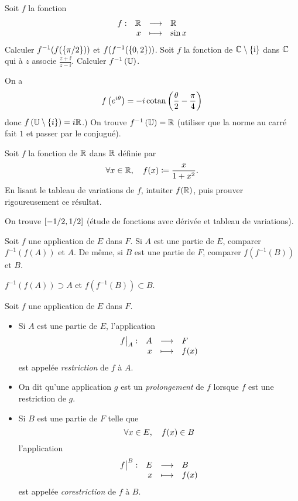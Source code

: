 \documentclass{magnolia}
\begin{document}
\begin{exos}
\exo Soit $f$ la fonction
  \[\begin{array}[t]{lrcl} \displaystyle{f} : & \displaystyle{\mathbb{R}} & \longrightarrow & \displaystyle{\mathbb{R}} \\ & \displaystyle{x} & \longmapsto & \displaystyle{\sin x} \end{array}\]
  Calculer $f^{-1}(f(\left\{\pi/2\right\}))$ et $f(f^{-1}(\left\{0, 2\right\}))$.
\exo Soit $f$ la fonction de $\mathbb{C}\setminus\left\{{\rm i}\right\}$ dans $\mathbb{C}$ qui à $z$
  associe $\frac{z+\ii}{z-\ii}$. Calculer %
  $f^\applirec \p{\U}$.
  \begin{sol}
  On a
  \[f\left(e^{i\theta}\right)=-i\operatorname{cotan}\left(\frac{\theta}{2}-\frac{\pi}{4}\right)\]
  donc $f\p{\U\setminus\ens{i}}=i\R$.) On trouve $f^\applirec \p{\U}=\R$
  (utiliser que la norme au carré fait $1$ et passer par le conjugué).
  \end{sol}
\exo Soit $f$ la fonction de $\mathbb{R}$ dans $\mathbb{R}$ définie par
  \[\forall x\in\mathbb{R} ,\quad f(x)\coloneqq\frac{x}{1+x^2}.\]
  En lisant le tableau de variations de $f$, intuiter $f(\mathbb{R})$, puis
  prouver rigoureusement ce résultat.
  \begin{sol}
  On trouve $\left[-1/2,1/2\right]$ (étude de fonctions avec dérivée et tableau de variations).
  \end{sol}
\exo Soit $f$ une application de $E$ dans $F$. Si $A$ est une partie de $E$,
  comparer $f^{-1}(f(A))$ et $A$. De même, si $B$ est une partie de $F$,
  comparer $f(f^{-1}(B))$ et $B$.  
 \begin{sol}
 $f^{-1}(f(A))\supset A$ et $f(f^{-1}(B))\subset B$.
 \end{sol}
\end{exos}


\begin{definition}[utile=-3]
Soit $f$ une application de $E$ dans $F$.
\begin{itemize}
\item Si $A$ est une partie de $E$, l'application
  \[\dspappli{\restri{f}{A}}{A}{F}{x}{f(x)}\]
  est appelée \emph{restriction} de $f$ à $A$.
\item On dit qu'une application $g$ est un
  \emph{prolongement} de $f$ lorsque $f$ est une restriction de $g$.
\item Si $B$ est une partie de $F$ telle que
  \[\forall x\in E ,\quad f(x)\in B\]
  l'application
  \[\dspappli{\corestri{f}{B}}{E}{B}{x}{f(x)}\]
  est appelée \emph{corestriction} de $f$ à $B$.
\end{itemize}
\end{definition}
\end{document}
